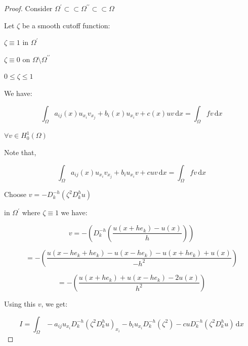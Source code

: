 \documentclass{article}
\theoremstyle{definition}
\begin{document}
\begin{proof}

    Consider \(\Omega ^{\prime}  \subset \subset \Omega ^{\prime\prime} \subset \subset \Omega\) 

    \begin{center}
    \end{center}

    Let \(\zeta\) be a smooth cutoff function:

    \(\zeta \equiv 1\) in \(\Omega ^{\prime} \) 

    \(\zeta \equiv 0\) on \(\Omega \setminus \Omega ^{\prime\prime} \)
    
    \(0 \leq \zeta \leq 1\) 

    We have:

    \[
        \int_{\Omega} a_{ij}(x) u_{x_i} v_{x_j} + b_i(x) u_{x_i} v + c(x) uv \,\mathrm{d}x = \int_{\Omega} fv \,\mathrm{d}x 
    \]

    \(\forall v\in H^1_0(\Omega)\) 

    Note that,

    \[
        \int_{\Omega} a_{ij}(x) u_{x_i} v_{x_j} + \boxed{b_i u_{x_i}} v + \boxed{c u} v \,\mathrm{d}x = \int_{\Omega} fv \,\mathrm{d}x 
    \]

    Choose \(v = - D_k^{-h} (\zeta^2 D_k^h u)\) 

    in \(\Omega ^{\prime} \) where \(\zeta \equiv 1\) we have:

    \[
        v = - \left( D_k^{-h} \left( \frac{u(x+he_k)-u(x)}{h} \right)  \right) 
    \]

    \[
        = - \left( \frac{u(x-h e_k + h e_k) - u(x - he_k) - u(x + h e_k) + u(x)}{-h^2} \right) 
    \]

    \[
        = - \left( \frac{u(x+he_k)+ u(x-he_k) - 2u(x)}{h^2} \right) 
    \]
    
    Using this \(v\), we get:

    \[
        I = \int_{\Omega} - a_{ij} u_{x_i} D_k^{-h} (\zeta^2 D_k^h u)_{x_i} - b_i u_{x_i} D_k^{-h} (\zeta^2) - cu D_k^{-h} (\zeta^2 D_k^h u) \,\mathrm{d}x 
    \]


\end{proof}
\end{document}
